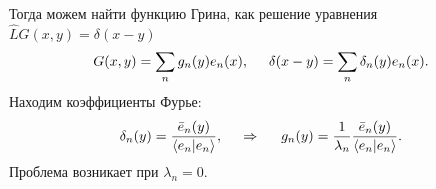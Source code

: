 Тогда можем найти функцию Грина, как решение уравнения $\hat{L} G(x, y) = \delta(x-y)$
\begin{equation*}
    G(x, y) = \sum_n g_n (y) e_n (x),
    \hspace{5 mm} 
    \delta(x-y) = \sum_n \delta_n ( y) e_n (x).
\end{equation*}
Находим коэффициенты Фурье: 
\begin{equation*}
    \delta_n (y) = \frac{\bar{e}_n (y)}{\langle e_n | e_n\rangle},
    \hspace{0.5cm} \Rightarrow \hspace{0.5cm}
    g_n (y) = \frac{1}{\lambda_n} \frac{\bar{e}_n (y)}{\langle e_n | e_n\rangle}.
\end{equation*}
Проблема возникает при $\lambda_n = 0$. 



